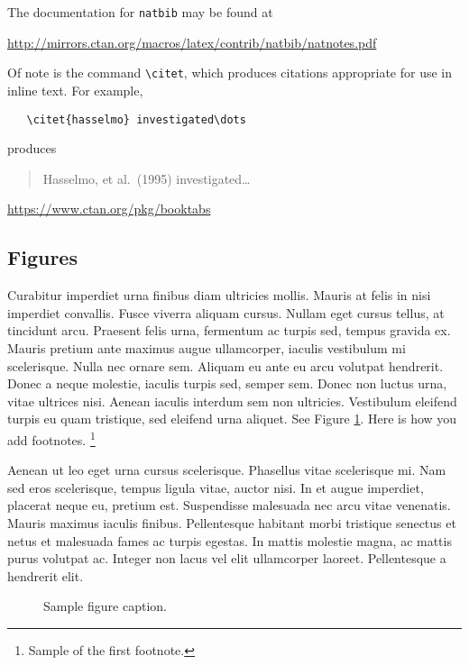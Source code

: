 \documentclass{article}
\begin{document}
The documentation for \verb+natbib+ may be found at
\begin{center}
  \url{http://mirrors.ctan.org/macros/latex/contrib/natbib/natnotes.pdf}
\end{center}
Of note is the command \verb+\citet+, which produces citations
appropriate for use in inline text.  For example,
\begin{verbatim}
   \citet{hasselmo} investigated\dots
\end{verbatim}
produces
\begin{quote}
  Hasselmo, et al.\ (1995) investigated\dots
\end{quote}

\begin{center}
  \url{https://www.ctan.org/pkg/booktabs}
\end{center}


\subsection{Figures}
Curabitur imperdiet urna finibus diam ultricies mollis. Mauris at felis in nisi imperdiet convallis. Fusce viverra aliquam cursus. Nullam eget cursus tellus, at tincidunt arcu. Praesent felis urna, fermentum ac turpis sed, tempus gravida ex. Mauris pretium ante maximus augue ullamcorper, iaculis vestibulum mi scelerisque. Nulla nec ornare sem. Aliquam eu ante eu arcu volutpat hendrerit. Donec a neque molestie, iaculis turpis sed, semper sem. Donec non luctus urna, vitae ultrices nisi. Aenean iaculis interdum sem non ultricies. Vestibulum eleifend turpis eu quam tristique, sed eleifend urna aliquet. 
See Figure \ref{fig:fig1}. Here is how you add footnotes. \footnote{Sample of the first footnote.}


Aenean ut leo eget urna cursus scelerisque. Phasellus vitae scelerisque mi. Nam sed eros scelerisque, tempus ligula vitae, auctor nisi. In et augue imperdiet, placerat neque eu, pretium est. Suspendisse malesuada nec arcu vitae venenatis. Mauris maximus iaculis finibus. Pellentesque habitant morbi tristique senectus et netus et malesuada fames ac turpis egestas. In mattis molestie magna, ac mattis purus volutpat ac. Integer non lacus vel elit ullamcorper laoreet. Pellentesque a hendrerit elit. 

\begin{figure}
  \centering
  \fbox{\rule[-.5cm]{4cm}{4cm} \rule[-.5cm]{4cm}{0cm}}
  \caption{Sample figure caption.}
  \label{fig:fig1}
\end{figure}
\end{document}
